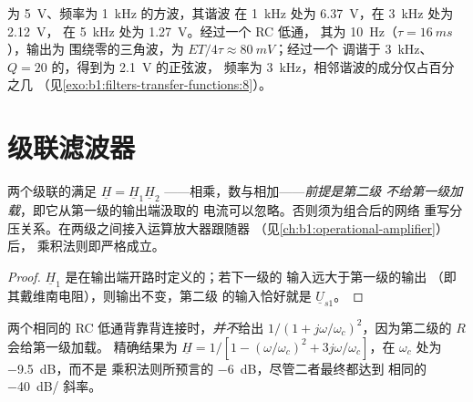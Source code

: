 \begin{example}[数值]\label{ex:b1:filters-transfer-functions:numbers}
为 \qty{5}{V}、频率为 \qty{1}{kHz} 的方波，其谐波
在 \qty{1}{kHz} 处为 \qty{6.37}{V}，在 \qty{3}{kHz} 处为 \qty{2.12}{V}，
在 \qty{5}{kHz} 处为 \qty{1.27}{V}。经过一个 RC 低通，
其为 \qty{10}{Hz}（$\tau = \qty{16}{ms}$），输出为
围绕零的三角波，为 $ET/4\tau \approx \qty{80}{mV}$；经过一个
调谐于 \qty{3}{kHz}、$Q = 20$ 的，得到为 \qty{2.1}{V} 的正弦波，
频率为 \qty{3}{kHz}，相邻谐波的成分仅占百分之几
（见\cref{exo:b1:filters-transfer-functions:8}）。
\end{example}

\section{级联滤波器}

\begin{proposition}[级联与负载效应]\label{prop:b1:filters-transfer-functions:cascade}
两个级联的满足 $\underline H = \underline H_1\underline H_2$
——相乘，数与相加——\emph{前提是第二级
不给第一级加载}，即它从第一级的输出端汲取的
电流可以忽略。否则须为组合后的网络
重写分压关系。在两级之间接入运算放大器跟随器
（见\cref{ch:b1:operational-amplifier}）后，
乘积法则即严格成立。
\end{proposition}

\begin{proof}
$\underline H_1$ 是在输出端开路时定义的；若下一级的
输入远大于第一级的输出
（即其戴维南电阻），则输出不变，第二级
的输入恰好就是 $\underline U_{s1}$。
\end{proof}

\begin{example}[两级 RC 电路]\label{ex:b1:filters-transfer-functions:tworc}
两个相同的 RC 低通背靠背连接时，\emph{并不}给出
$1/(1 + j\omega/\omega_c)^2$，因为第二级的 $R$ 会给第一级加载。
精确结果为 $\underline H = 1/[1 - (\omega/\omega_c)^2 +
3j\omega/\omega_c]$，在 $\omega_c$ 处为 \qty{-9.5}{dB}，而不是
乘积法则所预言的 \qty{-6}{dB}，尽管二者最终都达到
相同的 \qty{-40}{dB/} 斜率。
\end{example}

